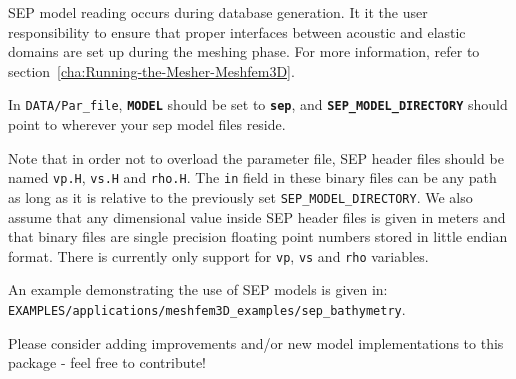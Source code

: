 SEP model reading occurs during database generation. It it the user responsibility
to ensure that proper interfaces between acoustic and elastic domains are set up
during the meshing phase. For more information, refer to
section~\ref{cha:Running-the-Mesher-Meshfem3D}.\newline

In \texttt{DATA/Par\_file}, \texttt{\textbf{MODEL}} should be set to \texttt{\textbf{sep}},
and \texttt{\textbf{SEP\_MODEL\_DIRECTORY}} should point to wherever your sep model files reside.\newline

Note that in order not to overload the parameter file, SEP header files
should be named \texttt{vp.H}, \texttt{vs.H} and \texttt{rho.H}. The \texttt{in} field
in these binary files can be any path as long as it is relative to
the previously set \texttt{SEP\_MODEL\_DIRECTORY}.
We also assume that any dimensional value inside SEP header files is given in meters and
that binary files are single precision floating point numbers stored in little endian format.
There is currently only support for \texttt{vp}, \texttt{vs} and \texttt{rho} variables.\newline

An example demonstrating the use of SEP models is given in:\newline
\texttt{EXAMPLES/applications/meshfem3D\_examples/sep\_bathymetry}.\newline


\noindent
Please consider adding improvements and/or new model implementations to this package - feel free to contribute!

